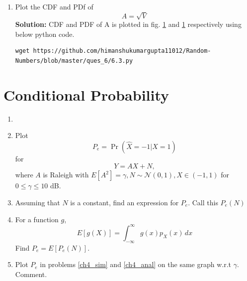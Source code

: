 \documentclass[journal,12pt,twocolumn]{IEEEtran}
\renewcommand\thesection{\arabic{section}}
\providecommand{\pr}[1]{\ensuremath{\Pr\left(#1\right)}}
\providecommand{\sbrak}[1]{\ensuremath{{}\left[#1\right]}}
\providecommand{\brak}[1]{\ensuremath{\left(#1\right)}}
\theoremstyle{remark}
\providecommand{\gauss}[2]{\mathcal{N}\ensuremath{\left(#1,#2\right)}}
\newcommand{\solution}{\noindent \textbf{Solution: }}
\numberwithin{equation}{section}
\begin{document}
\begin{enumerate}[label=\thesection.\arabic*
,ref=\thesection.\theenumi]
and 
since $X_1$ and $X_2$ are i.i.d.
\begin{align}
	\therefore
p_{X_1,X_2}\brak{x_1,x_2}=p_{X_1}\brak{x_1}\times p_{X_2}\brak{x_2}
\end{align}
\item
\label{ch3_raleigh_sim}
Plot the CDF and PDf of
%
\begin{equation}
A = \sqrt{V}
\end{equation}
\solution
CDF and PDF of A is plotted in fig. \ref{} and \ref{} respectively using below python code.
\begin{lstlisting}
wget https://github.com/himanshukumargupta11012/Random-Numbers/blob/master/ques_6/6.3.py
	\end{lstlisting}
\end{enumerate}
\section{Conditional Probability}
\begin{enumerate}[label=\thesection.\arabic*
,ref=\thesection.\theenumi]
\item
\item
\label{ch4_sim}
Plot 
\begin{equation}
P_e = \pr{\hat{X} = -1|X=1}
\end{equation}
%
for 
\begin{equation}
Y = AX+N,
\end{equation}
where $A$ is Raleigh with $E\sbrak{A^2} = \gamma, N \sim \gauss{0}{1}, X \in \brak{-1,1}$ for $0 \le \gamma \le 10$ dB.
%
\item
Assuming that $N$ is a constant, find an expression for $P_e$.  Call this $P_e(N)$
%
\item
%
\label{ch4_anal}
For a function $g$,
\begin{equation}
E\sbrak{g(X)} = \int_{-\infty}^{\infty}g(x)p_{X}(x)\, dx
\end{equation}
%
Find $P_e = E\sbrak{P_e(N)}$.
%
\item
Plot $P_e$ in problems \ref{ch4_sim} and \ref{ch4_anal} on the same graph w.r.t $\gamma$.  Comment.
		\end{enumerate}
\end{document}
